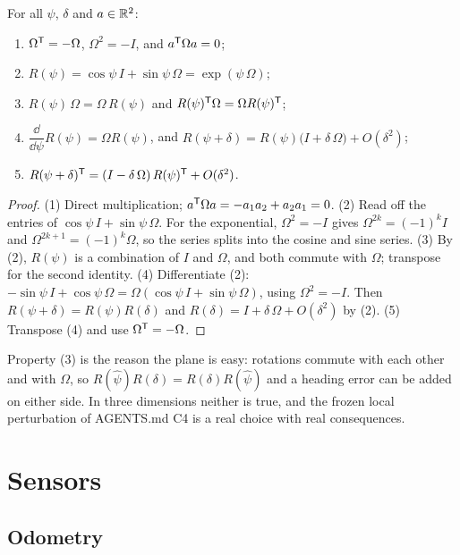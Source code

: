 \begin{lemma}
\label{lem:omega}
For all $\psi$, $\delta$ and $a \in \mathbb{R}^2$:
\begin{enumerate}
  \item $\Omega^{\mathsf{T}} = -\Omega$, $\Omega^2 = -I$, and $a^{\mathsf{T}}\Omega a = 0$;
  \item $R(\psi) = \cos\psi\,I + \sin\psi\,\Omega = \exp(\psi\,\Omega)$;
  \item $R(\psi)\,\Omega = \Omega\,R(\psi)$ and $R(\psi)^{\mathsf{T}}\Omega = \Omega R(\psi)^{\mathsf{T}}$;
  \item $\dfrac{\dd}{\dd\psi}R(\psi) = \Omega R(\psi)$, and $R(\psi + \delta) = R(\psi)\big(I + \delta\,\Omega\big) + O(\delta^2)$;
  \item $R(\psi + \delta)^{\mathsf{T}} = (I - \delta\,\Omega)\,R(\psi)^{\mathsf{T}} + O(\delta^2)$.
\end{enumerate}
\end{lemma}
\begin{proof}
(1) Direct multiplication; $a^{\mathsf{T}}\Omega a = -a_1a_2 + a_2a_1 = 0$. (2) Read off the entries of $\cos\psi\,I + \sin\psi\,\Omega$. For the exponential,
$\Omega^2 = -I$ gives $\Omega^{2k} = (-1)^kI$ and $\Omega^{2k+1} = (-1)^k\Omega$, so the series splits into the cosine and sine series. (3) By (2),
$R(\psi)$ is a combination of $I$ and $\Omega$, and both commute with $\Omega$; transpose for the second identity. (4) Differentiate (2):
$-\sin\psi\,I + \cos\psi\,\Omega = \Omega(\cos\psi\,I + \sin\psi\,\Omega)$, using $\Omega^2 = -I$. Then $R(\psi + \delta) = R(\psi)R(\delta)$ and
$R(\delta) = I + \delta\,\Omega + O(\delta^2)$ by (2). (5) Transpose (4) and use $\Omega^{\mathsf{T}} = -\Omega$.
\end{proof}

Property (3) is the reason the plane is easy: rotations commute with each other and with $\Omega$, so $R(\hat\psi)R(\delta) = R(\delta)R(\hat\psi)$
and a heading error can be added on either side. In three dimensions neither is true, and the frozen local perturbation of AGENTS.md C4 is a
real choice with real consequences.

\section{Sensors}

\subsection{Odometry}

